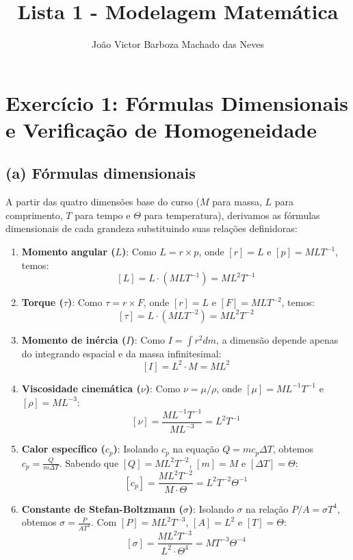 \documentclass{article}
\title{Lista 1 - Modelagem Matemática}
\author{João Victor Barboza Machado das Neves}
\date{} %
\begin{document}
\maketitle

\section*{Exercício 1: Fórmulas Dimensionais e Verificação de Homogeneidade}

\subsection*{(a) Fórmulas dimensionais}
A partir das quatro dimensões base do curso ($M$ para massa, $L$ para comprimento, $T$ para tempo e $\Theta$ para temperatura), derivamos as fórmulas dimensionais de cada grandeza substituindo suas relações definidoras:

\begin{enumerate}
    \item \textbf{Momento angular ($L$)}: 
    Como $L = r \times p$, onde $[r] = L$ e $[p] = MLT^{-1}$, temos:
    \[ [L] = L \cdot (MLT^{-1}) = ML^2T^{-1} \]
    
    \item \textbf{Torque ($\tau$)}: 
    Como $\tau = r \times F$, onde $[r] = L$ e $[F] = MLT^{-2}$, temos:
    \[ [\tau] = L \cdot (MLT^{-2}) = ML^2T^{-2} \]
    
    \item \textbf{Momento de inércia ($I$)}: 
    Como $I = \int r^2 dm$, a dimensão depende apenas do integrando espacial e da massa infinitesimal:
    \[ [I] = L^2 \cdot M = ML^2 \]
    
    \item \textbf{Viscosidade cinemática ($\nu$)}: 
    Como $\nu = \mu / \rho$, onde $[\mu] = ML^{-1}T^{-1}$ e $[\rho] = ML^{-3}$:
    \[ [\nu] = \frac{ML^{-1}T^{-1}}{ML^{-3}} = L^2T^{-1} \]
    
    \item \textbf{Calor específico ($c_p$)}: 
    Isolando $c_p$ na equação $Q = mc_p\Delta T$, obtemos $c_p = \frac{Q}{m\Delta T}$. Sabendo que $[Q] = ML^2T^{-2}$, $[m] = M$ e $[\Delta T] = \Theta$:
    \[ [c_p] = \frac{ML^2T^{-2}}{M \cdot \Theta} = L^2T^{-2}\Theta^{-1} \]
    
    \item \textbf{Constante de Stefan-Boltzmann ($\sigma$)}: 
    Isolando $\sigma$ na relação $P/A = \sigma T^4$, obtemos $\sigma = \frac{P}{A T^4}$. Com $[P] = ML^2T^{-3}$, $[A] = L^2$ e $[T] = \Theta$:
    \[ [\sigma] = \frac{ML^2T^{-3}}{L^2 \cdot \Theta^4} = MT^{-3}\Theta^{-4} \]
\end{enumerate}
\end{document}
